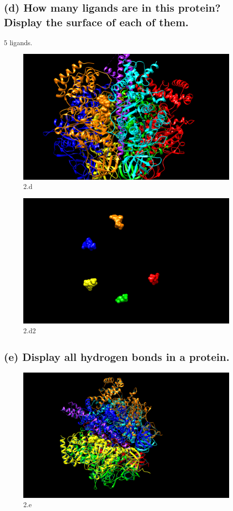 \documentclass[a4paper, 12pt, one column]{article}
\begin{document}
\subsection*{(d) How many ligands are in this protein? Display the surface of each of them.}
5 ligands.\\
\begin{figure}[H]
    \centering
    \includegraphics[width=.8\linewidth]{2_d.png}
    \caption{2.d}
    \label{fig:2_d.png}
\end{figure}
\begin{figure}[H]
    \centering
    \includegraphics[width=.8\linewidth]{2_d2.png}
    \caption{2.d2}
    \label{fig:2_d2.png}
\end{figure}
\subsection*{(e) Display all hydrogen bonds in a protein.}
\begin{figure}[H]
    \centering
    \includegraphics[width=.8\linewidth]{2_e.png}
    \caption{2.e}
    \label{fig:2_e.png}
\end{figure}
\end{document}
